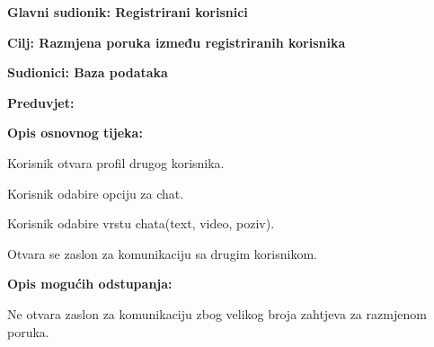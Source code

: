 					\noindent {}
					\begin{packed_item}
						
						\item \textbf{Glavni sudionik: Registrirani korisnici}
						\item  \textbf{Cilj: Razmjena poruka između registriranih korisnika} 
						\item  \textbf{Sudionici: Baza podataka} 
						\item  \textbf{Preduvjet: } 
						\item  \textbf{Opis osnovnog tijeka:}
						
						\item[] \begin{packed_enum}
							
							\item Korisnik otvara profil drugog korisnika.
							\item Korisnik odabire opciju za chat.
							\item Korisnik odabire vrstu chata(text, video, poziv).
							\item Otvara se zaslon za komunikaciju sa drugim korisnikom.
						
						\end{packed_enum}
						
						\item  \textbf{Opis mogućih odstupanja:}
						
						\item[] \begin{packed_item}
							 
							\item[3.a] Ne otvara zaslon za komunikaciju zbog velikog broja zahtjeva za razmjenom poruka.
							
						\end{packed_item}
					\end{packed_item}
					
